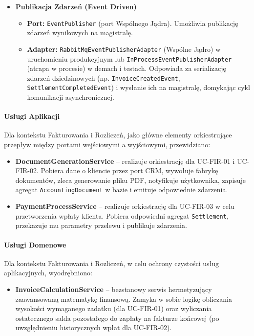 \begin{itemize}
    \item \textbf{Publikacja Zdarzeń (Event Driven)}
    \begin{itemize}
        \item \textbf{Port:} \texttt{EventPublisher} (port Wspólnego Jądra). Umożliwia publikację zdarzeń wynikowych na magistralę.
        \item \textbf{Adapter:} \texttt{RabbitMqEventPublisherAdapter} (Wspólne Jądro) w uruchomieniu produkcyjnym lub \texttt{InProcessEventPublisherAdapter} (atrapa w procesie) w demach i testach. Odpowiada za serializację zdarzeń dziedzinowych (np. \texttt{InvoiceCreatedEvent}, \texttt{SettlementCompletedEvent}) i wysłanie ich na magistralę, domykając cykl komunikacji asynchronicznej.
    \end{itemize}
\end{itemize}

\paragraph{Usługi Aplikacji} 
Dla kontekstu Fakturowania i Rozliczeń, jako główne elementy orkiestrujące przepływ między portami wejściowymi a wyjściowymi, przewidziano:
\begin{itemize}
    \item \textbf{DocumentGenerationService} – realizuje orkiestrację dla UC-FIR-01 i UC-FIR-02. Pobiera dane o kliencie przez port CRM, wywołuje fabrykę dokumentów, zleca generowanie pliku PDF, notyfikuje użytkownika, zapisuje agregat \texttt{AccountingDocument} w bazie i emituje odpowiednie zdarzenia.
    \item \textbf{PaymentProcessService} – realizuje orkiestrację dla UC-FIR-03 w celu przetworzenia wpłaty klienta. Pobiera odpowiedni agregat \texttt{Settlement}, przekazuje mu parametry przelewu i publikuje zdarzenia.
\end{itemize}

\paragraph{Usługi Domenowe} 
Dla kontekstu Fakturowania i Rozliczeń, w celu ochrony czystości usług aplikacyjnych, wyodrębniono:
\begin{itemize}
    \item \textbf{InvoiceCalculationService} – bezstanowy serwis hermetyzujący zaawansowaną matematykę finansową. Zamyka w sobie logikę obliczania wysokości wymaganego zadatku (dla UC-FIR-01) oraz wyliczania ostatecznego salda pozostałego do zapłaty na fakturze końcowej (po uwzględnieniu historycznych wpłat dla UC-FIR-02).
\end{itemize}

